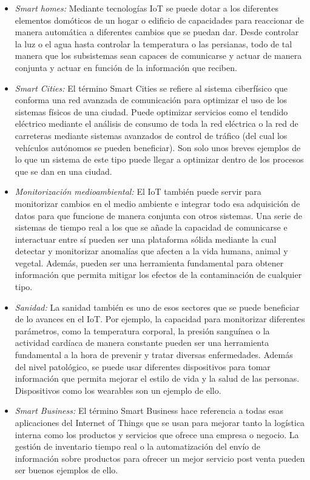 \begin{itemize}
	\item \emph{Smart homes:} Mediante tecnologías IoT se puede dotar a los diferentes elementos domóticos de un hogar o edificio de capacidades para reaccionar de manera automática a diferentes cambios que se puedan dar. Desde controlar la luz o el agua hasta controlar la temperatura o las persianas, todo de tal manera que los subsistemas sean capaces de comunicarse y actuar de manera conjunta y actuar en función de la información que reciben.
	
	\item \emph{Smart Cities:} El término Smart Cities se refiere al sistema ciberfísico que conforma una red avanzada de comunicación para optimizar el uso de los sistemas físicos de una ciudad. Puede optimizar servicios como el tendido eléctrico mediante el análisis de consumo de toda la red eléctrica o la red de carreteras mediante sistemas avanzados de control de tráfico (del cual los vehículos autónomos se pueden beneficiar). Son solo unos breves ejemplos de lo que un sistema de este tipo puede llegar a optimizar dentro de los procesos que se dan en una ciudad.
	
	\item \emph{Monitorización medioambiental:} El IoT también puede servir para monitorizar cambios en el medio ambiente e integrar todo esa adquisición de datos para que funcione de manera conjunta con otros sistemas. Una serie de sistemas de tiempo real a los que se añade la capacidad de comunicarse e interactuar entre sí pueden ser una plataforma sólida mediante la cual detectar y monitorizar anomalías que afecten a la vida humana, animal y vegetal. Además, pueden ser una herramienta fundamental para obtener información que permita mitigar los efectos de la contaminación de cualquier tipo.
	
	\item \emph{Sanidad:} La sanidad también es uno de esos sectores que se puede beneficiar de lo avances en el IoT. Por ejemplo, la capacidad para monitorizar diferentes parámetros, como la temperatura corporal, la presión sanguínea o la actividad cardíaca de manera constante pueden ser una herramienta fundamental a la hora de prevenir y tratar diversas enfermedades. Además del nivel patológico, se puede usar  diferentes dispositivos para tomar información que permita mejorar el estilo de vida y la salud de las personas. Dispositivos como los wearables son un ejemplo de ello. 
	
	\item \emph{Smart Business:} El término Smart Business hace referencia a todas esas aplicaciones del Internet of Things que se usan para mejorar tanto la logística interna como los productos y servicios que ofrece una empresa o negocio. La gestión de inventario tiempo real o la automatización del envío de información sobre productos para ofrecer un mejor servicio post venta pueden ser buenos ejemplos de ello.
	

\end{itemize}
